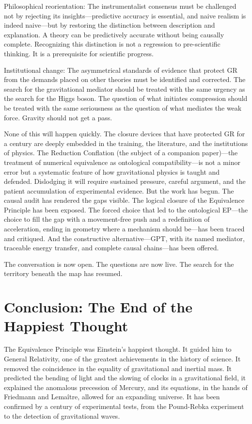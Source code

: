 \documentclass[11pt]{article}
\begin{document}
Philosophical reorientation: The instrumentalist consensus must be challenged not by rejecting its insights---predictive accuracy is essential, and naive realism is indeed naive---but by restoring the distinction between description and explanation. A theory can be predictively accurate without being causally complete. Recognizing this distinction is not a regression to pre-scientific thinking. It is a prerequisite for scientific progress.

Institutional change: The asymmetrical standards of evidence that protect GR from the demands placed on other theories must be identified and corrected. The search for the gravitational mediator should be treated with the same urgency as the search for the Higgs boson. The question of what initiates compression should be treated with the same seriousness as the question of what mediates the weak force. Gravity should not get a pass.

None of this will happen quickly. The closure devices that have protected GR for a century are deeply embedded in the training, the literature, and the institutions of physics. The Reduction Conflation (the subject of a companion paper)---the treatment of numerical equivalence as ontological compatibility---is not a minor error but a systematic feature of how gravitational physics is taught and defended. Dislodging it will require sustained pressure, careful argument, and the patient accumulation of experimental evidence. But the work has begun. The causal audit has rendered the gaps visible. The logical closure of the Equivalence Principle has been exposed. The forced choice that led to the ontological EP---the choice to fill the gap with a movement-free push and a redefinition of acceleration, ending in geometry where a mechanism should be---has been traced and critiqued. And the constructive alternative---GPT, with its named mediator, traceable energy transfer, and complete causal chains---has been offered.

The conversation is now open. The questions are now live. The search for the territory beneath the map has resumed.

\section{Conclusion: The End of the Happiest Thought}

The Equivalence Principle was Einstein's happiest thought. It guided him to General Relativity, one of the greatest achievements in the history of science. It removed the coincidence in the equality of gravitational and inertial mass. It predicted the bending of light and the slowing of clocks in a gravitational field, it explained the anomalous precession of Mercury, and its equations, in the hands of Friedmann and Lemaître, allowed for an expanding universe. It has been confirmed by a century of experimental tests, from the Pound-Rebka experiment to the detection of gravitational waves.
\end{document}
